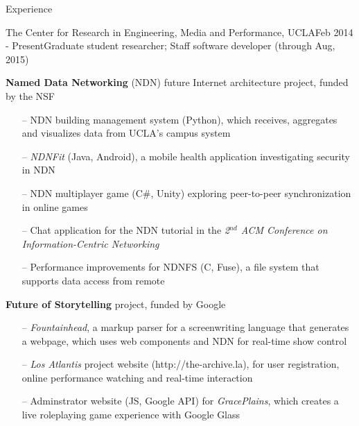 \documentclass{resume} %
\begin{document}
\begin{rSection}{Experience}

\begin{rSubsection}{The Center for Research in Engineering, Media and Performance, UCLA}{Feb 2014 - Present}{Graduate student researcher; Staff software developer (through Aug, 2015)}{}
\item \textbf{Named Data Networking} (NDN) future Internet architecture project, funded by the NSF

\begin{itemize}[noitemsep,topsep=-6pt,leftmargin=1em]
\item[--] NDN building management system (Python), which receives, aggregates and visualizes data from UCLA's campus system
\item[--] \textit{NDNFit} (Java, Android), a mobile health application investigating security in NDN
\item[--] NDN multiplayer game (C\#, Unity) exploring peer-to-peer synchronization in online games
\item[--] Chat application for the NDN tutorial in the \textit{2$^{nd}$ ACM Conference on Information-Centric Networking}
\item[--] Performance improvements for NDNFS (C, Fuse), a file system that supports data access from remote
\end{itemize}

\item \textbf{Future of Storytelling} project, funded by Google

\begin{itemize}[noitemsep,topsep=-6pt,leftmargin=1em]
\item[--] \textit{Fountainhead}, a markup parser for a screenwriting language that generates a webpage, which uses web components and NDN for real-time show control
\item[--] \textit{Los Atlantis} project website (http://the-archive.la), for user registration, online performance watching and real-time interaction
\item[--] Adminstrator website (JS, Google API) for \textit{GracePlains}, which creates a live roleplaying game experience with Google Glass
\end{itemize}


\end{rSubsection}
\end{rSection}
\end{document}
